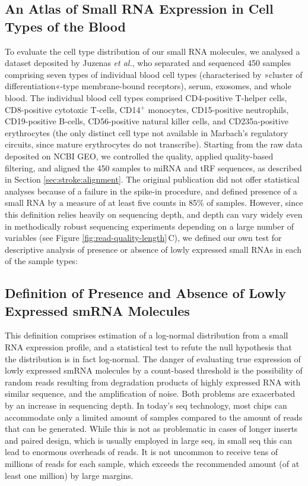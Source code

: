 \begin{method}
\subsection{An Atlas of Small RNA Expression in Cell Types of the Blood} \label{sec:stroke:juzenas}
To evaluate the cell type distribution of our small RNA molecules, we analysed a dataset deposited by Juzenas \emph{et al.},\cite{Juzenas2017} who separated and sequenced 450 samples comprising seven types of individual blood cell types (characterised by »cluster of differentiation«-type membrane-bound receptors), serum, exosomes, and whole blood. The individual blood cell types comprised CD4-positive T-helper cells, CD8-positive cytotoxic T-cells, CD14$^+$ monocytes, CD15-positive neutrophils, CD19-positive B-cells, CD56-positive natural killer cells, and CD235a-positive erythrocytes (the only distinct cell type not available in Marbach's regulatory circuits, since mature erythrocytes do not transcribe). Starting from the raw data deposited on NCBI GEO, we controlled the quality, applied quality-based filtering, and aligned the 450 samples to miRNA and tRF sequences, as described in Section \ref{sec:stroke:alignment}. The original publication did not offer statistical analyses because of a failure in the spike-in procedure, and defined presence of a small RNA by a measure of at least five counts in 85\% of samples. However, since this definition relies heavily on sequencing depth, and depth can vary widely even in methodically robust sequencing experiments depending on a large number of variables (see Figure \ref{fig:read-quality-length}\,C), we defined our own test for descriptive analysis of presence or absence of lowly expressed small RNAs in each of the sample types:

\subsection[Definition of Presence and Absence of Lowly Expressed\texorpdfstring{\\}{} smRNA Molecules]{Definition of Presence and Absence of Lowly Expressed smRNA Molecules}
This definition comprises estimation of a log-normal distribution from a small RNA expression profile, and a statistical test to refute the null hypothesis that the distribution is in fact log-normal. The danger of evaluating true expression of lowly expressed smRNA molecules by a count-based threshold is the possibility of random reads resulting from degradation products of highly expressed RNA with similar sequence, and the amplification of noise. Both problems are exacerbated by an increase in sequencing depth. In today's \ac{seq} technology, most chips can accommodate only a limited amount of samples compared to the amount of reads that can be generated. While this is not as problematic in cases of longer inserts and paired design, which is usually employed in large \ac{seq}, in small \ac{seq} this can lead to enormous overheads of reads. It is not uncommon to receive tens of millions of reads for each sample, which exceeds the recommended amount (of at least one million) by large margins.


\end{method}
